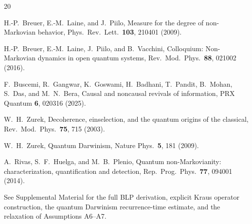 \documentclass[aps,prl,twocolumn,superscriptaddress,hyperref]{revtex4-2}
\begin{document}
\begin{thebibliography}{20}

H.-P.~Breuer, E.-M.~Laine, and J.~Piilo,
Measure for the degree of non-Markovian behavior,
Phys.\ Rev.\ Lett.\ \textbf{103}, 210401 (2009).

H.-P.~Breuer, E.-M.~Laine, J.~Piilo, and B.~Vacchini,
Colloquium: Non-Markovian dynamics in open quantum systems,
Rev.\ Mod.\ Phys.\ \textbf{88}, 021002 (2016).

F.~Buscemi, R.~Gangwar, K.~Goswami, H.~Badhani, T.~Pandit, B.~Mohan, S.~Das, and M.~N.~Bera,
Causal and noncausal revivals of information,
PRX Quantum \textbf{6}, 020316 (2025).

W.~H.~Zurek,
Decoherence, einselection, and the quantum origins of the classical,
Rev.\ Mod.\ Phys.\ \textbf{75}, 715 (2003).

W.~H.~Zurek,
Quantum Darwinism,
Nature Phys.\ \textbf{5}, 181 (2009).

A.~Rivas, S.~F.~Huelga, and M.~B.~Plenio,
Quantum non-Markovianity: characterization, quantification and detection,
Rep.\ Prog.\ Phys.\ \textbf{77}, 094001 (2014).

See Supplemental Material for the full BLP derivation, explicit Kraus operator construction, the quantum Darwinism recurrence-time estimate, and the relaxation of Assumptions A6--A7.

\end{thebibliography}
\end{document}
